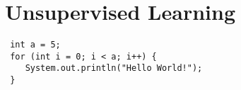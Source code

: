 \maketitle
\chapter{Unsupervised Learning}
\begin{verbatim}
 int a = 5;
 for (int i = 0; i < a; i++) {
 	System.out.println("Hello World!");
 }


\end{verbatim}